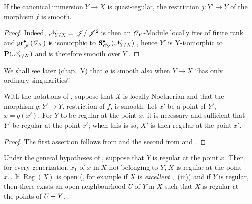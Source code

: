 \begin{corollary}[19.4.3]
\label{IV.19.4.3}
If the canonical immersion $Y\to X$ is quasi-regular, the restriction $g:Y'\to Y$ of the morphism $f$ is smooth.
\end{corollary}

\begin{proof}
Indeed, $\mathscr{N}_{Y/X}=\mathscr{J}/\mathscr{J}^2$ is then an $\mathscr{O}_Y$-Module locally free of finite rank and $\operatorname{gr}_{\mathscr{J}}^\bullet(\mathscr{O}_X)$ is isomorphic to $\mathbf{S}_{\mathscr{O}_Y}^\bullet(\mathscr{N}_{Y/X})$ , hence $Y'$ is Y-isomorphic to $\mathbf{P}(\mathscr{N}_{Y/X})$ and is therefore smooth over $Y$ .
\end{proof}

We shall see later (chap.~V) that $g$ is smooth also when $Y\to X$ ``has only ordinary singularities''.

\begin{proposition}[19.4.4]
\label{IV.19.4.4}
With the notations of , suppose that $X$ is locally Noetherian and that the morphism $g:Y'\to Y$, restriction of $f$, is smooth.
Let $x'$ be a point of $Y'$, $x=g(x')$.
For $Y$ to be regular at the point $x$, it is necessary and sufficient that $Y'$ be regular at the point $x'$; when this is so, $X'$ is then regular at the point $x'$.
\end{proposition}

\begin{proof}
The first assertion follows from  and the second from  and .
\end{proof}

\begin{corollary}[19.4.5]
\label{IV.19.4.5}
Under the general hypotheses of , suppose that $Y$ is regular at the point $x$.
Then, for every generization $x_1$ of $x$ in $X$ not belonging to $Y$, $X$ is regular at the point $x_1$.
If $\operatorname{Reg}(X)$ is open \textup{(, for example if $X$ is \emph{excellent} ,~(iii))}
and if $Y$ is regular, then there exists an open neighbourhood $U$ of $Y$ in $X$ such that $X$ is regular at the points of $U- Y$.
\end{corollary}

